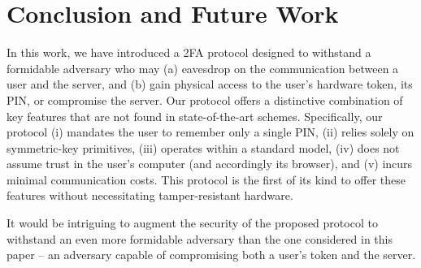 
\section{Conclusion and Future Work}
\vspace{-.5mm}

In this work, we have introduced a 2FA protocol designed to withstand a formidable adversary who may (a) eavesdrop on the communication between a user and the server, and (b) gain physical access to the user's hardware token, its PIN, or compromise the server. Our protocol offers a distinctive combination of key features that are not found in state-of-the-art schemes. Specifically,  our protocol (i) mandates the user to remember only a single PIN, (ii) relies solely on symmetric-key primitives, (iii) operates within a standard model, (iv) does not assume trust in the user's computer (and accordingly its browser), and (v) incurs minimal communication costs. This protocol is the first of its kind to offer these features without necessitating tamper-resistant hardware. 

It would be intriguing to augment the security of the proposed protocol to withstand an even more formidable adversary than the one considered in this paper -- an adversary capable of compromising both a user's token and the server.

% 
%




